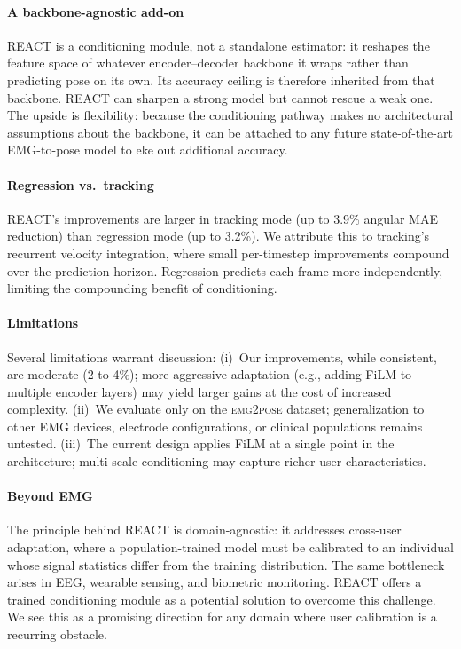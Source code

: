 \documentclass[conference]{IEEEtran}
\begin{document}
\paragraph{A backbone-agnostic add-on}
REACT is a conditioning module, not a standalone estimator: it reshapes the feature space of whatever encoder--decoder backbone it wraps rather than predicting pose on its own. Its accuracy ceiling is therefore inherited from that backbone. REACT can sharpen a strong model but cannot rescue a weak one. The upside is flexibility: because the conditioning pathway makes no architectural assumptions about the backbone, it can be attached to any future state-of-the-art EMG-to-pose model to eke out additional accuracy.

\paragraph{Regression vs.\ tracking}
REACT's improvements are larger in tracking mode (up to 3.9\% angular MAE reduction) than regression mode (up to 3.2\%). We attribute this to tracking's recurrent velocity integration, where small per-timestep improvements compound over the prediction horizon. Regression predicts each frame more independently, limiting the compounding benefit of conditioning.

\paragraph{Limitations}
Several limitations warrant discussion: (i)~Our improvements, while consistent, are moderate (2 to 4\%); more aggressive adaptation (e.g., adding FiLM to multiple encoder layers) may yield larger gains at the cost of increased complexity. (ii)~We evaluate only on the \textsc{emg2pose} dataset; generalization to other EMG devices, electrode configurations, or clinical populations remains untested. (iii)~The current design applies FiLM at a single point in the architecture; multi-scale conditioning may capture richer user characteristics.

\paragraph{Beyond EMG}
The principle behind REACT is domain-agnostic: it addresses cross-user adaptation, where a population-trained model must be calibrated to an individual whose signal statistics differ from the training distribution. The same bottleneck arises in EEG, wearable sensing, and biometric monitoring. REACT offers a trained conditioning module as a potential solution to overcome this challenge. We see this as a promising direction for any domain where user calibration is a recurring obstacle.
\end{document}
